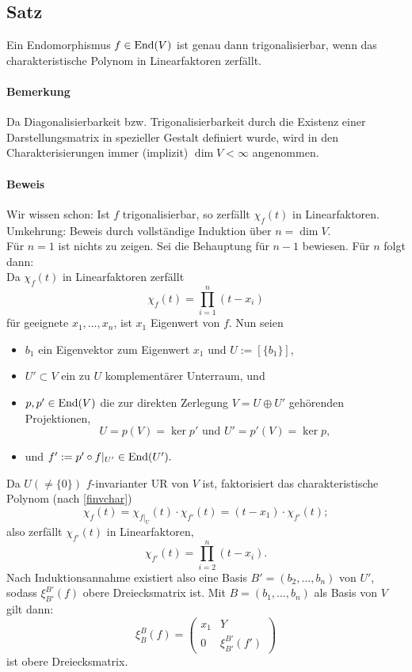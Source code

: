 \subsection{Satz}
\begin{Satz}
	Ein Endomorphismus $ f\in\operatorname{End}(V) $ ist genau dann trigonalisierbar, wenn das charakteristische Polynom in Linearfaktoren zerfällt.
\end{Satz}
\paragraph{Bemerkung}
	Da Diagonalisierbarkeit bzw. Trigonalisierbarkeit durch die Existenz einer Darstellungsmatrix in spezieller Gestalt definiert wurde, wird in den Charakterisierungen immer (implizit) $ \dim V < \infty $ angenommen.
\paragraph{Beweis}
	Wir wissen schon: Ist $ f $ trigonalisierbar, so zerfällt $ \chi_f(t) $ in Linearfaktoren. Umkehrung: Beweis durch vollständige Induktion über $ n=\dim V $.\\
	Für $ n=1 $ ist nichts zu zeigen. Sei die Behauptung für $ n-1 $ bewiesen. Für $ n $ folgt dann:\\
	Da $ \chi_f(t) $ in Linearfaktoren zerfällt
		\[ \chi_f(t)=\prod_{i=1}^{n}(t-x_i) \]
	für geeignete $ x_1,\dots,x_n $, ist $ x_1 $ Eigenwert von $ f $. Nun seien
	\begin{itemize}
		\item $ b_1 $ ein Eigenvektor zum Eigenwert $ x_1 $ und $ U:= [\{b_1\}] $,
		\item $ U'\subset V $ ein zu $ U $ komplementärer Unterraum, und
		\item $ p,p'\in \operatorname{End}(V) $ die zur direkten Zerlegung $ V = U\oplus U' $ gehörenden Projektionen,
			\[ U = p(V) = \ker p' \text{ und } U' = p'(V) = \ker p, \]
		\item und $ f' := p'\circ f|_{U'}\in\operatorname{End}(U'). $
	\end{itemize}
	Da $ U (\neq \{0\}) $ $ f $-invarianter UR von $ V $ ist, faktorisiert das charakteristische Polynom (nach \ref{finvchar})
		\[ \chi_f(t)=\chi_{f|_U}(t)\cdot \chi_{f'}(t) = (t-x_1)\cdot \chi_{f'}(t); \]
	also zerfällt $ \chi_{f'}(t) $ in Linearfaktoren,
		\[ \chi_{f'}(t)=\prod_{i=2}^{n}(t-x_i). \]
	Nach Induktionsannahme existiert also eine Basis $ B' = (b_2,\dots,b_n) $ von $ U' $, sodass $ \xi_{B'}^{B'}(f) $ obere Dreiecksmatrix ist. Mit $ B=(b_1,\dots,b_n) $ als Basis von $ V $ gilt dann:
		\[ \xi_B^B (f) =
			\begin{pmatrix}
			x_1& Y\\
			0 & \xi_{B'}^{B'}(f')
			\end{pmatrix} \]
	ist obere Dreiecksmatrix.